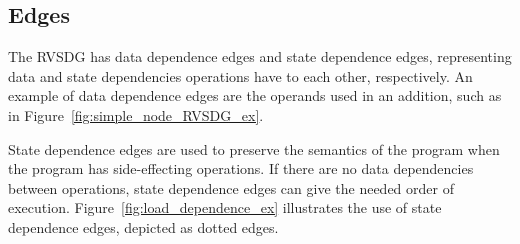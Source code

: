 \subsection{Edges}

The RVSDG has data dependence edges and state dependence edges, representing
data and state dependencies operations have to each other, respectively. An
example of data dependence edges are the operands used in an addition, such as
in Figure~\ref{fig:simple_node_RVSDG_ex}.

State dependence edges are used to preserve the semantics of the program when
the program has side-effecting operations. If there are no data dependencies
between operations, state dependence edges can give the needed order of
execution. Figure~\ref{fig:load_dependence_ex} illustrates the use of state
dependence edges, depicted as dotted edges.

